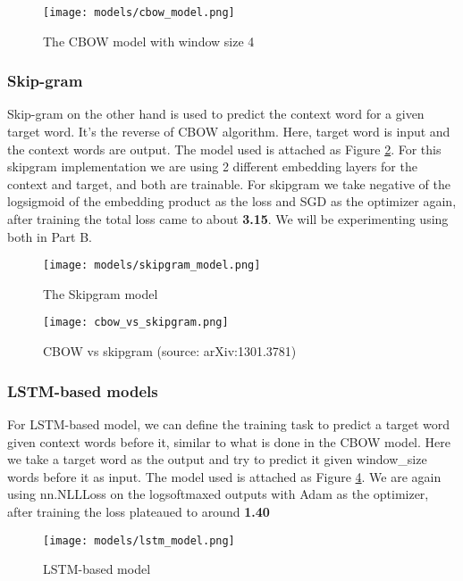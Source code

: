 \documentclass{article}
\begin{document}
\begin{figure}[H]
    \centering
    \texttt{[image: models/cbow\_model.png]}
    \caption{The CBOW model with window size 4}
    \label{fig:cbow_model}
\end{figure}

\subsubsection*{Skip-gram}

Skip-gram on the other hand is used to predict the context word for a given target word. It’s the reverse of CBOW algorithm. Here, target word is input and the context words are output. The model used is attached as Figure \ref{fig:skipgram_model}. For this skipgram implementation we are using 2 different embedding layers for the context and target, and both are trainable. For skipgram we take negative of the logsigmoid of the embedding product as the loss and SGD as the optimizer again, after training the total loss came to about \textbf{3.15}. We will be experimenting using both in Part B.

\vspace{3.0em}

\begin{figure}[H]
    \centering
    \texttt{[image: models/skipgram\_model.png]}
    \caption{The Skipgram model}
    \label{fig:skipgram_model}
\end{figure}


\begin{figure}[H]
    \centering
    \texttt{[image: cbow\_vs\_skipgram.png]}
    \caption{CBOW vs skipgram (source: arXiv:1301.3781)}
    \label{fig:comaprison_model}
\end{figure}
\subsubsection*{LSTM-based models}

For LSTM-based model, we can define the training task to predict a target word given context words before it, similar to what is done in the CBOW model. Here we take a target word as the output and try to predict it given window\_size words before it as input. The model used is attached as Figure \ref{fig:lsmt_q1_model}. We are again using nn.NLLLoss on the logsoftmaxed outputs with Adam as the optimizer, after training the loss plateaued to around \textbf{1.40}
\begin{figure}[H]
    \centering
    \texttt{[image: models/lstm\_model.png]}
    \caption{LSTM-based model}
    \label{fig:lsmt_q1_model}
\end{figure}
\end{document}
